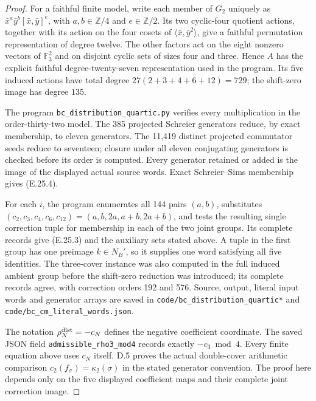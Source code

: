 \begin{proof}
For a faithful finite model, write each member of $G_2$ uniquely
as $\bar x^a\bar y^b[\bar x,\bar y]^e$, with
$a,b\in\mathbb Z/4$ and $e\in\mathbb Z/2$.
Its two cyclic-four quotient actions, together with its action
on the four cosets of $\langle\bar x,\bar y^2\rangle$, give a
faithful permutation representation of degree twelve.
The other factors act on the eight nonzero vectors of
$\mathbb F_3^2$ and on disjoint cyclic sets of sizes four and
three.  Hence $A$ has the explicit faithful degree-twenty-seven
representation used in the program.  Its five induced actions
have total degree $27(2+3+4+6+12)=729$; the shift-zero image
has degree $135$.

The program \texttt{bc\_distribution\_quartic.py} verifies every
multiplication in the order-thirty-two model.  The 385 projected
Schreier generators reduce, by exact membership, to eleven
generators.  The 11,419 distinct projected commutator seeds
reduce to seventeen; closure under all eleven conjugating
generators is checked before its order is computed.  Every
generator retained or added is the image of the displayed
actual source words.  Exact Schreier--Sims membership gives
(E.25.4).

For each $i$, the program enumerates all 144 pairs $(a,b)$,
substitutes $(c_2,c_3,c_4,c_6,c_{12})=(a,b,2a,a+b,2a+b)$,
and tests the resulting single correction tuple for membership
in each of the two joint groups.  Its complete records give
(E.25.3) and the auxiliary sets stated above.  A tuple in the
first group has one preimage $k\in N_B'$, so it supplies one
word satisfying all five identities.  The three-cover instance
was also computed in the full induced ambient group before
the shift-zero reduction was introduced; its complete records
agree, with correction orders 192 and 576.  Source, output,
literal input words and generator arrays are saved in
\texttt{code/bc\_distribution\_quartic*} and
\texttt{code/bc\_cm\_literal\_words.json}.

The notation $\rho_N^{\rm dist}=-c_N$ defines the negative
coefficient coordinate. The saved JSON field
\texttt{admissible\_rho3\_mod4} records exactly $-c_3\bmod4$.
Every finite equation above uses $c_N$ itself. D.5 proves the
actual double-cover arithmetic comparison
$c_2(f_\sigma)=\kappa_2(\sigma)$ in the stated generator convention.
The proof here depends only on the five displayed coefficient maps
and their complete joint correction image.
\end{proof}

